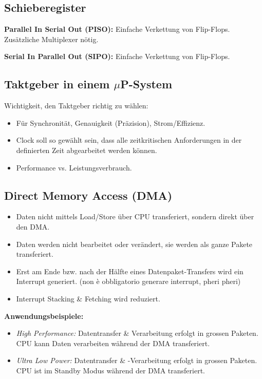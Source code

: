 \subsection{Schieberegister}
\textbf{Parallel In Serial Out (PISO):}
Einfache Verkettung von Flip-Flops. Zusätzliche Multiplexer nötig.

\textbf{Serial In Parallel Out (SIPO):}
Einfache Verkettung von Flip-Flops.



\subsection[Taktgeber in einem uP-System]{Taktgeber in einem $\mu$P-System}
Wichtigkeit, den Taktgeber richtig zu wählen:
\begin{itemize}
    \item Für Synchronität, Genauigkeit (Präzision), Strom/Effizienz.
    \item Clock soll so gewählt sein, dass alle zeitkritischen Anforderungen in der definierten Zeit abgearbeitet werden können.
    \item Performance vs. Leistungsverbrauch.
\end{itemize}

\subsection{Direct Memory Access (DMA)}
\begin{itemize}
    \item Daten  nicht mittels Load/Store über CPU transferiert, sondern direkt über den DMA.
    \item Daten werden nicht bearbeitet oder verändert, sie werden als ganze Pakete transferiert.
    \item Erst am Ende bzw. nach der Hälfte eines Datenpaket-Transfers wird ein Interrupt
     generiert. (non è obbligatorio generare interrupt, pheri \textrightarrow pheri)
    \item Interrupt Stacking \& Fetching wird reduziert.
\end{itemize}

\textbf{Anwendungsbeispiele:}
\begin{itemize}
    \item \textit{High Performance:} Datentransfer \& Verarbeitung erfolgt in grossen Paketen. CPU kann Daten verarbeiten während der DMA transferiert.
    \item \textit{Ultra Low Power:} Datentransfer \& -Verarbeitung erfolgt in grossen Paketen. CPU ist im Standby Modus während der DMA transferiert.
\end{itemize}


